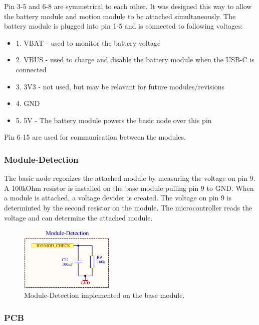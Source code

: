     Pin 3-5 and 6-8 are symmetrical to each other. It was designed this way
    to allow the battery module and motion module to be attached simultaneously.
    The battery module is plugged into pin 1-5 and is connected to following 
    voltages:
    
    \begin{itemize}
        \item 1. VBAT - used to monitor the battery voltage
        \item 2. VBUS - used to charge and disable the battery module when the USB-C 
        is connected
        \item 3. 3V3 - not used, but may be relavant for future modules/revisions
        \item 4. GND
        \item 5. 5V - The battery module powers the basic node over this pin
    \end{itemize}

    Pin 6-15 are used for communication between the modules. 


    \subsubsection{Module-Detection}
    
    The basic node regonizes the attached module by measuring the voltage on pin 9.
    A 100kOhm resistor is installed on the base module pulling pin 9 to GND. 
    When a module is attached, a voltage devider is created. The voltage on pin 9 is 
    determinted by the second resistor on the module. The microcontroller reads the
    voltage and can determine the attached module. 
    
    \begin{figure}[H]
        \centering
        \includegraphics[width=0.4\textwidth]{assets/HW/Module-Detection-schematic.png}
        \caption{Module-Detection implemented on the base module.}
    \end{figure}

    \subsubsection{PCB}

